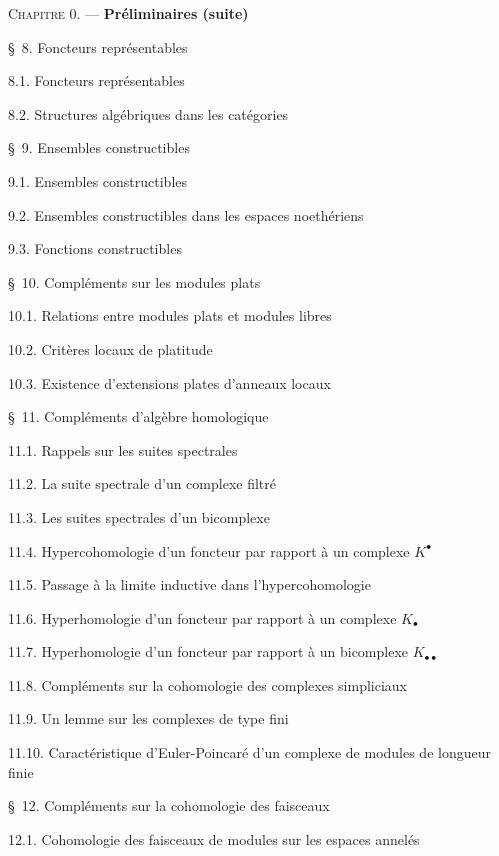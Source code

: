 \begin{flushleft}
\textsc{Chapitre 0.} --- \textbf{Préliminaires (suite)} 

\medskip
\S~8. Foncteurs représentables 

8.1. Foncteurs représentables 

8.2. Structures algébriques dans les catégories 

\medskip
\S~9. Ensembles constructibles 

9.1. Ensembles constructibles 

9.2. Ensembles constructibles dans les espaces noethériens 

9.3. Fonctions constructibles 

\medskip
\S~10. Compléments sur les modules plats 

10.1. Relations entre modules plats et modules libres 

10.2. Critères locaux de platitude 

10.3. Existence d'extensions plates d'anneaux locaux 

\medskip
\S~11. Compléments d'algèbre homologique 

11.1. Rappels sur les suites spectrales 

11.2. La suite spectrale d'un complexe filtré 

11.3. Les suites spectrales d'un bicomplexe 

11.4. Hypercohomologie d'un foncteur par rapport à un complexe $K^\bullet$

11.5. Passage à la limite inductive dans l'hypercohomologie 

11.6. Hyperhomologie d'un foncteur par rapport à un complexe $K_\bullet$

11.7. Hyperhomologie d'un foncteur par rapport à un bicomplexe
$K_{\bullet\bullet}$ 

11.8. Compléments sur la cohomologie des complexes simpliciaux 

11.9. Un lemme sur les complexes de type fini 

11.10. Caractéristique d'Euler-Poincaré d'un complexe de modules de longueur
finie 

\medskip
\S~12. Compléments sur la cohomologie des faisceaux 

12.1. Cohomologie des faisceaux de modules sur les espaces annelés 


\end{flushleft}
